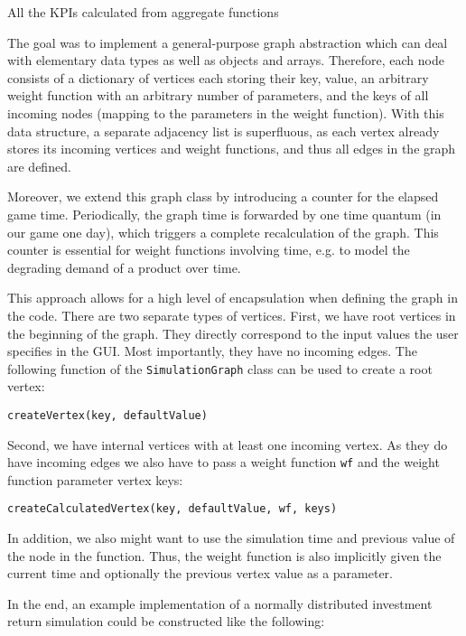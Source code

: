 All the KPIs calculated from aggregate functions
 
The goal was to implement a general-purpose graph abstraction which can deal with elementary data types as well as objects and arrays.
Therefore, each node consists of a dictionary of vertices each storing their key, value, an arbitrary weight function with an arbitrary number of parameters, and the keys of all incoming nodes (mapping to the parameters in the weight function). With this data structure, a separate adjacency list is superfluous, as each vertex already stores its incoming vertices and weight functions, and thus all edges in the graph are defined.


Moreover, we extend this graph class by introducing a counter for the elapsed game time. Periodically, the graph time is forwarded by one time quantum (in our game one day), which triggers a complete recalculation of the graph. This counter is essential for weight functions involving time, e.g. to model the degrading demand of a product over time.

This approach allows for a high level of encapsulation when defining the graph in the code. There are two separate types of vertices. First, we have root vertices in the beginning of the graph. They directly correspond to the input values the user specifies in the GUI. Most importantly, they have no incoming edges. The following function of the \texttt{SimulationGraph} class can be used to create a root vertex:

\begin{center}
	\texttt{createVertex(key, defaultValue)}
\end{center}

Second, we have internal vertices with at least one incoming vertex. As they do have incoming edges we also have to pass a weight function \texttt{wf} and the weight function parameter vertex keys:
\begin{center}
	\texttt{createCalculatedVertex(key, defaultValue, wf, keys)}
\end{center}
 
 In addition, we also might want to use the simulation time and previous value of the node in the function. Thus, the weight function is also implicitly given the current time and optionally the previous vertex value as a parameter.
 
 
 
 In the end, an example implementation of a normally distributed investment return simulation could be constructed like the following:\\
 
